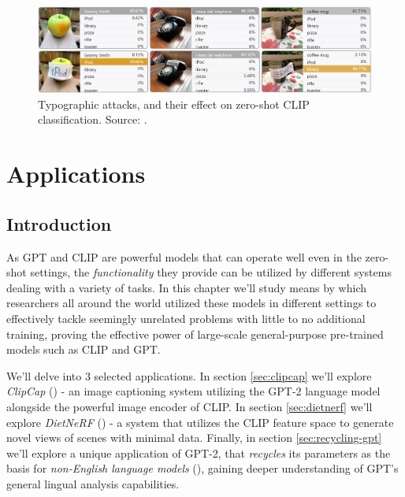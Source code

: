 \documentclass{article}
\begin{document}
\begin{figure}[ht!]
    \begin{center}
        \includegraphics[width=1.0\textwidth]{figures/typographic_attacks.png}
    \end{center}
    \caption{
        Typographic attacks, and their effect on zero-shot CLIP classification. Source: \citet{goh2021multimodal}.
    }
    \label{fig:typographic_attacks}
\end{figure}




\newpage
\section{Applications}
\label{chap:apps}



\subsection{Introduction}
\label{sec:apps-intro}

As GPT and CLIP are powerful models that can operate well even in the zero-shot settings, the \emph{functionality} they provide can be utilized by different systems dealing with a variety of tasks. In this chapter we'll study means by which researchers all around the world utilized these models in different settings to effectively tackle seemingly unrelated problems with little to no additional training, proving the effective power of large-scale general-purpose pre-trained models such as CLIP and GPT.

\medskip
\noindent
We'll delve into 3 selected applications. In section \ref{sec:clipcap} we'll explore \emph{ClipCap} (\citet{mokady2021clipcap}) - an image captioning system utilizing the GPT-2 language model alongside the powerful image encoder of CLIP. In section \ref{sec:dietnerf} we'll explore \emph{DietNeRF} (\citet{Jain_2021_dietnerf}) - a system that utilizes the CLIP feature space to generate novel views of scenes with minimal data. Finally, in section \ref{sec:recycling-gpt} we'll explore a unique application of GPT-2, that \emph{recycles} its parameters as the basis for \emph{non-English language models} (\citet{deVries2020recycle}), gaining deeper understanding of GPT's general lingual analysis capabilities.
\end{document}
